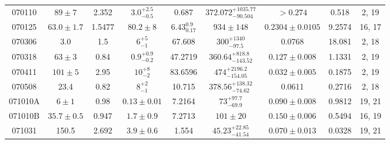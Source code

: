 \documentclass[a4paper,fleqn,usenatbib]{mnras}
\begin{document}
\begin{table*}
\begin{tabular}[width=1.0 \linewidth]{ccccccccc}
 070110 &	$89 \pm 7$ &	2.352 &	$3.0_{-0.5}^{+2.5}$ &	0.687 &	$372.072_{-90.504}^{+1035.77}$ &	$>0.274$ &	0.518 &	2, 19 \\																																																																					070125 &	$63.0\pm1.7$ &	1.5477 &	$80.2 \pm 8$ &	$6.43_{0.17 }^{0.9}$ &	$934 \pm 148$ &	$0.2304\pm0.0105$ &	9.2574 &	16, 17 \\																																																																					070306 &	3.0 &	1.5 &	$6_{-1}^{+5}$ &	67.608 &	$300_{-97.5}^{+1340}$ &	0.0768 &	18.081 &	2, 18 \\																																																																					070318 &	$63\pm3$ &	0.84 &	$0.9_{-0.2}^{+0.9}$ &	47.2719 &	$360.64_{-143.52}^{+818.8}$ &	$0.127 \pm 0.008$ &	1.1331 &	2, 19 \\																																																																					070411 &	$101\pm5$ &	2.95 &	$10_{-2}^{+8}$ &	83.6596 &	$474_{-154.05}^{+2196.2}$ &	$0.032 \pm 0.005$ &	0.1875 &	2, 19 \\																																																																					070508 &	23.4 &	0.82 &	$8_{-1}^{+2}$ &	    10.715 &	$378.56_{-74.62}^{+138.32}$ &	0.0611 &	0.2716 &	2, 18 \\																																																																					071010A &	$6\pm1$ &	0.98 &	$0.13\pm0.01$ &	7.2164 &	$73_{-69.9}^{+97.7}$ &	$0.090 \pm 0.008$ &	0.9812 &	19, 21 \\																																																																					071010B &	$35.7\pm0.5$ &	0.947 &	$1.7 \pm 0.9$ &	7.2713 &	$101 \pm 20$ &	$0.150 \pm 0.006$ &	0.5494 &	16, 19 \\																																																																					071031 &	150.5 &	2.692 &	$3.9\pm0.6$ &	1.554 &	$45.23_{-41.54}^{+22.85}$ &	$0.070 \pm 0.013$ &	0.0328 &	19, 21 \\		
 \hline																																																																																																																																								\end{tabular}
\end{table*}
\end{document}
